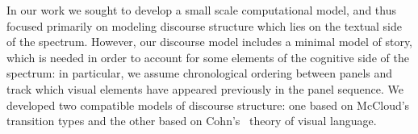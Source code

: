 
%
%
%

In our work we sought to develop a small scale computational model, and thus
focused primarily on modeling discourse structure which lies on the textual
side of the spectrum. However, our discourse model includes a minimal model of
story, which is needed in order to account for some elements of the cognitive
side of the spectrum: in particular, we assume chronological ordering
between panels and track which visual elements have appeared previously in the
panel sequence.  We developed two compatible models of discourse
structure: one based on McCloud's transition types and the other based on
Cohn's~\cite{cohn2013visual} theory of visual language.


